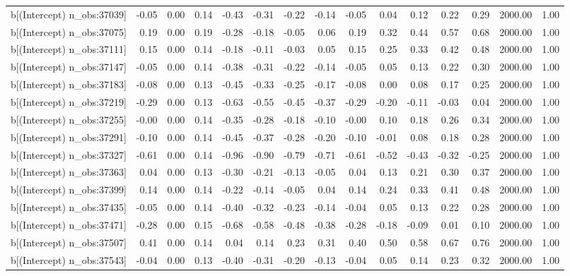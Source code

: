 \begin{table}[ht]
\begin{tabular}{rrrrrrrrrrrrrrr}
  b[(Intercept) n\_obs:37039] & -0.05 & 0.00 & 0.14 & -0.43 & -0.31 & -0.22 & -0.14 & -0.05 & 0.04 & 0.12 & 0.22 & 0.29 & 2000.00 & 1.00 \\ 
  b[(Intercept) n\_obs:37075] & 0.19 & 0.00 & 0.19 & -0.28 & -0.18 & -0.05 & 0.06 & 0.19 & 0.32 & 0.44 & 0.57 & 0.68 & 2000.00 & 1.00 \\ 
  b[(Intercept) n\_obs:37111] & 0.15 & 0.00 & 0.14 & -0.18 & -0.11 & -0.03 & 0.05 & 0.15 & 0.25 & 0.33 & 0.42 & 0.48 & 2000.00 & 1.00 \\ 
  b[(Intercept) n\_obs:37147] & -0.05 & 0.00 & 0.14 & -0.38 & -0.31 & -0.22 & -0.14 & -0.05 & 0.05 & 0.13 & 0.22 & 0.30 & 2000.00 & 1.00 \\ 
  b[(Intercept) n\_obs:37183] & -0.08 & 0.00 & 0.13 & -0.45 & -0.33 & -0.25 & -0.17 & -0.08 & 0.00 & 0.08 & 0.17 & 0.25 & 2000.00 & 1.00 \\ 
  b[(Intercept) n\_obs:37219] & -0.29 & 0.00 & 0.13 & -0.63 & -0.55 & -0.45 & -0.37 & -0.29 & -0.20 & -0.11 & -0.03 & 0.04 & 2000.00 & 1.00 \\ 
  b[(Intercept) n\_obs:37255] & -0.00 & 0.00 & 0.14 & -0.35 & -0.28 & -0.18 & -0.10 & -0.00 & 0.10 & 0.18 & 0.26 & 0.34 & 2000.00 & 1.00 \\ 
  b[(Intercept) n\_obs:37291] & -0.10 & 0.00 & 0.14 & -0.45 & -0.37 & -0.28 & -0.20 & -0.10 & -0.01 & 0.08 & 0.18 & 0.28 & 2000.00 & 1.00 \\ 
  b[(Intercept) n\_obs:37327] & -0.61 & 0.00 & 0.14 & -0.96 & -0.90 & -0.79 & -0.71 & -0.61 & -0.52 & -0.43 & -0.32 & -0.25 & 2000.00 & 1.00 \\ 
  b[(Intercept) n\_obs:37363] & 0.04 & 0.00 & 0.13 & -0.30 & -0.21 & -0.13 & -0.05 & 0.04 & 0.13 & 0.21 & 0.30 & 0.37 & 2000.00 & 1.00 \\ 
  b[(Intercept) n\_obs:37399] & 0.14 & 0.00 & 0.14 & -0.22 & -0.14 & -0.05 & 0.04 & 0.14 & 0.24 & 0.33 & 0.41 & 0.48 & 2000.00 & 1.00 \\ 
  b[(Intercept) n\_obs:37435] & -0.05 & 0.00 & 0.14 & -0.40 & -0.32 & -0.23 & -0.14 & -0.04 & 0.05 & 0.13 & 0.22 & 0.28 & 2000.00 & 1.00 \\ 
  b[(Intercept) n\_obs:37471] & -0.28 & 0.00 & 0.15 & -0.68 & -0.58 & -0.48 & -0.38 & -0.28 & -0.18 & -0.09 & 0.01 & 0.10 & 2000.00 & 1.00 \\ 
  b[(Intercept) n\_obs:37507] & 0.41 & 0.00 & 0.14 & 0.04 & 0.14 & 0.23 & 0.31 & 0.40 & 0.50 & 0.58 & 0.67 & 0.76 & 2000.00 & 1.00 \\ 
  b[(Intercept) n\_obs:37543] & -0.04 & 0.00 & 0.13 & -0.40 & -0.31 & -0.20 & -0.13 & -0.04 & 0.05 & 0.14 & 0.23 & 0.32 & 2000.00 & 1.00 \\ 

\end{tabular}
\end{table}
